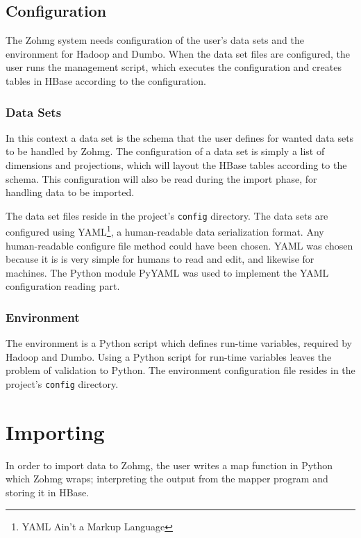 \subsection*{Configuration}

The Zohmg system needs configuration of the user's data sets and the environment
for Hadoop and Dumbo. When the data set files are configured, the user runs the
management script, which executes the configuration and creates tables in HBase
according to the configuration.


\subsubsection*{Data Sets}


In this context a data set is the schema that the user defines for wanted data
sets to be handled by Zohmg. The configuration of a data set is simply a list
of dimensions and projections, which will layout the HBase tables according to
the schema. This configuration will also be read during the import phase, for
handling data to be imported.

The data set files reside in the project's \texttt{config} directory. The data
sets are configured using YAML\footnote{YAML Ain't a Markup Language}, a
human-readable data serialization format. Any human-readable configure file
method could have been chosen. YAML was chosen because it is is very simple
for humans to read and edit, and likewise for machines. The Python module
PyYAML was used to implement the YAML configuration reading part. \cite{pyyaml}


\subsubsection*{Environment}

The environment is a Python script which defines run-time variables, required by
Hadoop and Dumbo. Using a Python script for run-time variables leaves the
problem of validation to Python. The environment configuration file resides in
the project's \texttt{config} directory.




\section{Importing}

In order to import data to Zohmg, the user writes a map function in Python which
Zohmg wraps; interpreting the output from the mapper program and storing it in
HBase.

